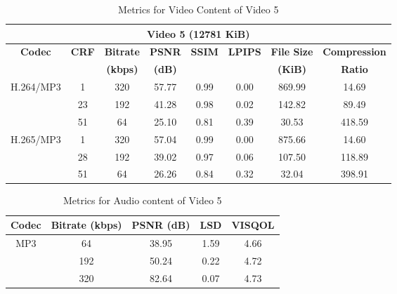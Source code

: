 \documentclass{ioereport}
\begin{document}
    \begin{table}[H]
        \centering
        \caption{Metrics for Video Content of Video 5}
        \label{table:vid-met-5}
        \begin{tabular}{|c|c|c|c|c|c|c|c|}
        \hline
        \multicolumn{8}{|c|}{\textbf{Video 5 (12781 KiB)}} \\ \hline
        \multirow{2}{*}{\textbf{Codec}} & \multirow{2}{*}{\textbf{CRF}} & \textbf{Bitrate} & \textbf{PSNR} & \textbf{SSIM} & \textbf{LPIPS} & \textbf{File Size} & \textbf{Compression} \\ 
        &  & \textbf{(kbps)} & \textbf{(dB)} &  &  & \textbf{(KiB)} & \textbf{Ratio} \\ \hline
        \multirow{3}{*}{H.264/MP3} & 1  & 320 & 57.77 & 0.99 & 0.00 & 869.99  & 14.69 \\ \cline{2-8} 
                                    & 23 & 192 & 41.28 & 0.98 & 0.02 & 142.82  & 89.49 \\ \cline{2-8} 
                                    & 51 & 64  & 25.10 & 0.81 & 0.39 & 30.53   & 418.59 \\ \hline
        \multirow{3}{*}{H.265/MP3} & 1  & 320 & 57.04 & 0.99 & 0.00 & 875.66  & 14.60 \\ \cline{2-8} 
                                    & 28 & 192 & 39.02 & 0.97 & 0.06 & 107.50  & 118.89 \\ \cline{2-8} 
                                    & 51 & 64  & 26.26 & 0.84 & 0.32 & 32.04   & 398.91 \\ \hline
        \end{tabular}
    \end{table}
    

    \begin{table}[H]
        \centering
        \caption{Metrics for Audio content of Video 5}
        \label{table:aud-met-5}
        \begin{tabular}{|c|c|c|c|c|}
        \hline
        \textbf{Codec} & \textbf{Bitrate (kbps)} & \textbf{PSNR (dB)} & \textbf{LSD} & \textbf{VISQOL} \\ \hline
        \multirow{3}{*}{MP3} & 64  & 38.95 & 1.59 & 4.66 \\ \cline{2-5} 
                                   & 192 & 50.24 & 0.22 & 4.72 \\ \cline{2-5} 
                                   & 320 & 82.64 & 0.07 & 4.73 \\ \hline
        \end{tabular}
    \end{table}
    
\end{document}
